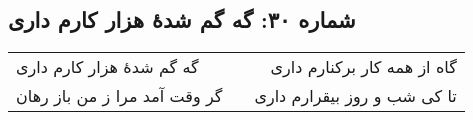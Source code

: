 \begin{center}
\section*{شماره ۳۰: گه گم شدۀ هزار کارم داری}
\label{sec:030}
\begin{longtable}{l p{0.5cm} r}
گه گم شدهٔ هزار کارم داری
&&
گاه از همه کار برکنارم داری
\\
گر وقت آمد مرا ز من باز رهان
&&
تا کی شب و روز بیقرارم داری
\\
\end{longtable}
\end{center}
